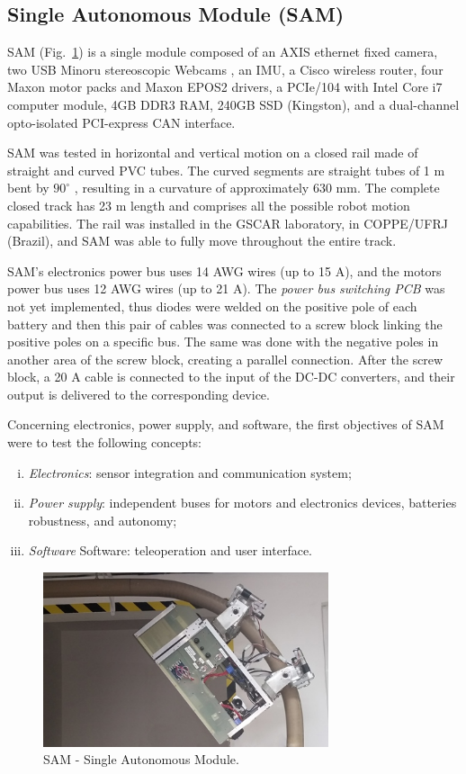 \documentclass{ifacconf}
\begin{document}
\subsection{Single Autonomous Module (SAM)}\label{sec:SAM_tests}
SAM (Fig.~\ref{fig:SAM2}) is a single module composed of an AXIS ethernet fixed
camera, two USB Minoru stereoscopic  Webcams , an IMU,
a Cisco wireless router, four Maxon motor packs and Maxon EPOS2 drivers, a PCIe/104 with Intel Core i7
computer module, 4GB DDR3 RAM, 240GB SSD (Kingston), and a dual-channel
opto-isolated PCI-express CAN interface. 

SAM was tested in horizontal and vertical motion on a closed rail made of
straight and curved PVC tubes. The curved segments are straight tubes of 1 m
bent by $90^{\circ}$ , resulting in a curvature of approximately 630 mm. The
complete closed track has 23 m length and comprises all the possible robot
motion capabilities. The rail was installed in the GSCAR laboratory, in
COPPE/UFRJ (Brazil), and SAM was able to fully move throughout the entire track.

SAM's electronics power bus uses 14 AWG wires (up to 15 A), and the motors power
bus uses 12 AWG wires (up to 21 A). The \emph{power bus switching PCB} was not
yet implemented, thus diodes were welded on the positive pole of each battery
and then this pair of cables was connected to a screw block linking the positive
poles on a specific bus. The same was done with the negative poles in another
area of the screw block, creating a parallel connection. After the screw block,
a 20 A cable is connected to the input of the DC-DC converters, and their
output is delivered to the corresponding device.

Concerning electronics, power supply, and software, the first objectives of SAM
were to test the following concepts:
\begin{enumerate}[i)]
\item \emph{Electronics}: sensor integration and communication
system;
\item \emph{Power supply}: independent buses for motors and electronics
devices, batteries robustness, and autonomy;
\item \emph{Software} Software: teleoperation and user interface.
\end{enumerate}

\begin{figure}
\centering
\includegraphics[width=8.4cm]{figs/SAM5_2.jpg}
\caption{SAM - Single Autonomous Module.}
\label{fig:SAM2}
\end{figure}
\end{document}
